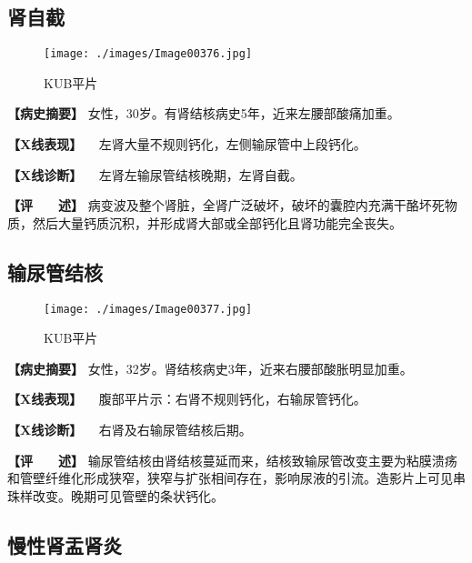 \subsection{肾自截}

\begin{figure}[!htbp]
    \centering
    \texttt{[image: ./images/Image00376.jpg]}
    \captionsetup{justification=centering}
    \caption{KUB平片}
    \label{fig6-4-4}
\end{figure}

\textbf{【病史摘要】}
女性，30岁。有肾结核病史5年，近来左腰部酸痛加重。

\textbf{【X线表现】} 　左肾大量不规则钙化，左侧输尿管中上段钙化。

\textbf{【X线诊断】} 　左肾左输尿管结核晚期，左肾自截。

\textbf{【评　　述】}
病变波及整个肾脏，全肾广泛破坏，破坏的囊腔内充满干酪坏死物质，然后大量钙质沉积，并形成肾大部或全部钙化且肾功能完全丧失。

\subsection{输尿管结核}

\begin{figure}[!htbp]
    \centering
    \texttt{[image: ./images/Image00377.jpg]}
    \captionsetup{justification=centering}
    \caption{KUB平片}
    \label{fig6-4-5}
\end{figure}

\textbf{【病史摘要】}
女性，32岁。肾结核病史3年，近来右腰部酸胀明显加重。

\textbf{【X线表现】} 　腹部平片示：右肾不规则钙化，右输尿管钙化。

\textbf{【X线诊断】} 　右肾及右输尿管结核后期。

\textbf{【评　　述】}
输尿管结核由肾结核蔓延而来，结核致输尿管改变主要为粘膜溃疡和管壁纤维化形成狭窄，狭窄与扩张相间存在，影响尿液的引流。造影片上可见串珠样改变。晚期可见管壁的条状钙化。

\subsection{慢性肾盂肾炎}

\begin{figure}
    \centering
    \\
    \\
    \caption{}
    \label{fig6-4-6}
\end{figure}

